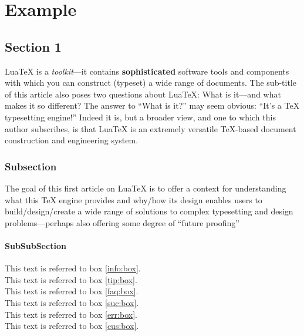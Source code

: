 \chapter{Example}

\section{Section 1}
Lua\TeX{} is a \textit{toolkit}—it contains \textbf{sophisticated} software tools and components with which you can construct (typeset) a wide range of documents. The sub-title of this article also poses two questions about Lua\TeX: What is it—and what makes it so different? The answer to “What is it?” may seem obvious: “It’s a \TeX{} typesetting engine!” Indeed it is, but a broader view, and one to which this author subscribes, is that Lua\TeX{} is an extremely versatile \TeX-based document construction and engineering system.

\subsection{Subsection}
The goal of this first article on Lua\TeX{} is to offer a context for understanding what this TeX engine provides and why/how its design enables users to build/design/create a wide range of solutions to complex typesetting and design problems—perhaps also offering some degree of “future proofing” 

\subsubsection{SubSubSection}
\lipsum[1]











This text is referred to box \ref{info:box}. \\
This text is referred to box \ref{tip:box}. \\
This text is referred to box \ref{faq:box}. \\
This text is referred to box \ref{suc:box}. \\
This text is referred to box \ref{err:box}. \\
This text is referred to box \ref{cus:box}. \\

